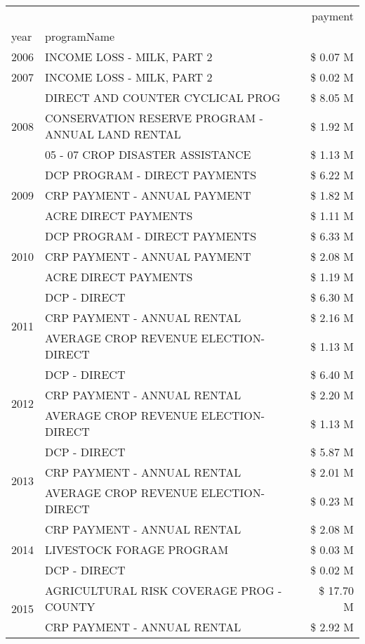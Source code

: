 \begin{tabular}{llr}
\toprule
 &  & payment \\
year & programName &  \\
\midrule
2006 & INCOME LOSS - MILK, PART 2 & \$ 0.07 M \\
\cline{1-3}
2007 & INCOME LOSS - MILK, PART 2 & \$ 0.02 M \\
\cline{1-3}
\multirow[t]{3}{*}{2008} & DIRECT AND COUNTER CYCLICAL PROG & \$ 8.05 M \\
 & CONSERVATION RESERVE PROGRAM - ANNUAL LAND RENTAL & \$ 1.92 M \\
 & 05 - 07 CROP DISASTER ASSISTANCE & \$ 1.13 M \\
\cline{1-3}
\multirow[t]{3}{*}{2009} & DCP PROGRAM - DIRECT PAYMENTS & \$ 6.22 M \\
 & CRP PAYMENT - ANNUAL PAYMENT & \$ 1.82 M \\
 & ACRE DIRECT PAYMENTS & \$ 1.11 M \\
\cline{1-3}
\multirow[t]{3}{*}{2010} & DCP PROGRAM - DIRECT PAYMENTS & \$ 6.33 M \\
 & CRP PAYMENT - ANNUAL PAYMENT & \$ 2.08 M \\
 & ACRE DIRECT PAYMENTS & \$ 1.19 M \\
\cline{1-3}
\multirow[t]{3}{*}{2011} & DCP - DIRECT & \$ 6.30 M \\
 & CRP PAYMENT - ANNUAL RENTAL & \$ 2.16 M \\
 & AVERAGE CROP REVENUE ELECTION-DIRECT & \$ 1.13 M \\
\cline{1-3}
\multirow[t]{3}{*}{2012} & DCP - DIRECT & \$ 6.40 M \\
 & CRP PAYMENT - ANNUAL RENTAL & \$ 2.20 M \\
 & AVERAGE CROP REVENUE ELECTION-DIRECT & \$ 1.13 M \\
\cline{1-3}
\multirow[t]{3}{*}{2013} & DCP - DIRECT & \$ 5.87 M \\
 & CRP PAYMENT - ANNUAL RENTAL & \$ 2.01 M \\
 & AVERAGE CROP REVENUE ELECTION-DIRECT & \$ 0.23 M \\
\cline{1-3}
\multirow[t]{3}{*}{2014} & CRP PAYMENT - ANNUAL RENTAL & \$ 2.08 M \\
 & LIVESTOCK FORAGE PROGRAM & \$ 0.03 M \\
 & DCP - DIRECT & \$ 0.02 M \\
\cline{1-3}
\multirow[t]{3}{*}{2015} & AGRICULTURAL RISK COVERAGE PROG - COUNTY & \$ 17.70 M \\
 & CRP PAYMENT - ANNUAL RENTAL & \$ 2.92 M \\

\end{tabular}
